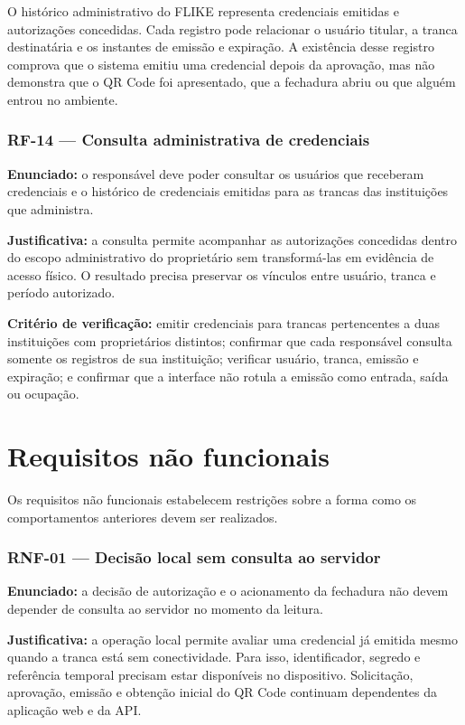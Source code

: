 O histórico administrativo do FLIKE representa credenciais emitidas e autorizações concedidas. Cada registro pode relacionar o usuário titular, a tranca destinatária e os instantes de emissão e expiração. A existência desse registro comprova que o sistema emitiu uma credencial depois da aprovação, mas não demonstra que o QR Code foi apresentado, que a fechadura abriu ou que alguém entrou no ambiente.

\subsubsection*{RF-14 --- Consulta administrativa de credenciais}

\textbf{Enunciado:} o responsável deve poder consultar os usuários que receberam credenciais e o histórico de credenciais emitidas para as trancas das instituições que administra.

\textbf{Justificativa:} a consulta permite acompanhar as autorizações concedidas dentro do escopo administrativo do proprietário sem transformá-las em evidência de acesso físico. O resultado precisa preservar os vínculos entre usuário, tranca e período autorizado.

\textbf{Critério de verificação:} emitir credenciais para trancas pertencentes a duas instituições com proprietários distintos; confirmar que cada responsável consulta somente os registros de sua instituição; verificar usuário, tranca, emissão e expiração; e confirmar que a interface não rotula a emissão como entrada, saída ou ocupação.

\section{Requisitos não funcionais}

Os requisitos não funcionais estabelecem restrições sobre a forma como os comportamentos anteriores devem ser realizados.

\subsubsection*{RNF-01 --- Decisão local sem consulta ao servidor}

\textbf{Enunciado:} a decisão de autorização e o acionamento da fechadura não devem depender de consulta ao servidor no momento da leitura.

\textbf{Justificativa:} a operação local permite avaliar uma credencial já emitida mesmo quando a tranca está sem conectividade. Para isso, identificador, segredo e referência temporal precisam estar disponíveis no dispositivo. Solicitação, aprovação, emissão e obtenção inicial do QR Code continuam dependentes da aplicação web e da API.

